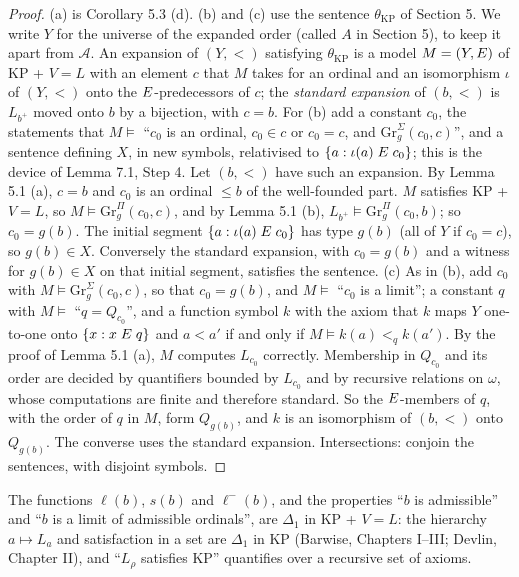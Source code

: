 \documentclass[11pt]{article}
\begin{document}
\begin{proof} (a) is Corollary 5.3 (d). (b) and (c) use the sentence $\theta_{\mathrm{KP}}$ of Section 5. We write
$Y$ for the universe of the expanded order (called $A$ in Section 5), to keep it apart from $\mathcal A$. An
expansion of $(Y, <)$ satisfying $\theta_{\mathrm{KP}}$ is a model $M = (Y, \mathrel{E})$ of KP + $V = L$ with an element
$c$ that $M$ takes for an ordinal and an isomorphism $\iota$ of $(Y, <)$ onto the $\mathrel{E}$-predecessors of $c$; the
\emph{standard expansion} of $(b, <)$ is $L_{b^+}$ moved onto $b$ by a bijection, with $c = b$. For (b)
add a constant $c_0$, the statements that $M \models$ ``$c_0$ is an ordinal, $c_0 \in c$ or $c_0 = c$, and
$\mathrm{Gr}^{\Sigma}_g(c_0, c)$'', and a sentence defining $X$, in new symbols, relativised to
$\{a : \iota(a) \mathrel{E} c_0\}$; this is the device of Lemma 7.1, Step 4. Let $(b, <)$ have such an expansion. By Lemma
5.1 (a), $c = b$ and $c_0$ is an ordinal $\le b$ of the well-founded part. $M$ satisfies KP + $V = L$, so
$M \models \mathrm{Gr}^{\Pi}_g(c_0, c)$, and by Lemma 5.1 (b), $L_{b^+} \models \mathrm{Gr}^{\Pi}_g(c_0, b)$; so
$c_0 = g(b)$. The initial segment $\{a : \iota(a) \mathrel{E} c_0\}$ has type $g(b)$ (all of $Y$ if $c_0 = c$), so
$g(b) \in X$. Conversely the standard expansion, with $c_0 = g(b)$ and a witness for $g(b) \in X$ on that initial
segment, satisfies the sentence. (c) As in (b), add $c_0$ with $M \models \mathrm{Gr}^{\Sigma}_g(c_0, c)$, so that
$c_0 = g(b)$, and $M \models$ ``$c_0$ is a limit''; a constant $q$ with $M \models$
``$q = Q_{c_0}$'', and a function symbol $k$ with the axiom that $k$ maps $Y$ one-to-one onto
$\{x : x \mathrel{E} q\}$ and $a < a'$ if and only if $M \models k(a) <_{q} k(a')$. By the proof of Lemma 5.1 (a), $M$
computes $L_{c_0}$ correctly. Membership in $Q_{c_0}$ and its order are decided by quantifiers bounded by $L_{c_0}$
and by recursive relations on $\omega$, whose computations are finite and therefore standard. So the
$\mathrel{E}$-members of $q$, with the order of $q$ in $M$, form $Q_{g(b)}$, and $k$ is an isomorphism of $(b, <)$ onto
$Q_{g(b)}$. The converse uses the standard expansion. Intersections: conjoin the sentences, with disjoint symbols.
\end{proof}

The functions $\ell(b)$, $s(b)$ and $\ell^-(b)$, and the properties ``$b$ is admissible'' and ``$b$ is a limit of admissible ordinals'', are
$\Delta_1$ in KP + $V = L$: the hierarchy $a \mapsto L_a$ and satisfaction in a set are $\Delta_1$ in KP (Barwise,
Chapters I--III; Devlin, Chapter II), and ``$L_{\rho}$ satisfies KP'' quantifies over a recursive set of axioms.
\end{document}
